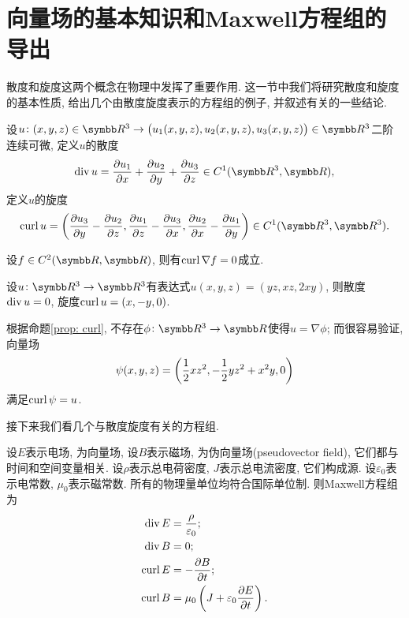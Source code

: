 \section{向量场的基本知识和Maxwell方程组的导出}

散度和旋度这两个概念在物理中发挥了重要作用. 这一节中我们将研究散度和旋度的基本性质, 给出几个由散度旋度表示的方程组的例子, 并叙述有关的一些结论.

\begin{definition}
    设$u\colon (x, y, z)\in\BR^3\to \left(u_1(x, y, z), u_2(x, y, z), u_3(x, y, z)\right)\in\BR^3$二阶连续可微, 定义$u$的散度
    \begin{equation}
        \divv u = \frac{\partial u_1}{\partial x}+\frac{\partial u_2}{\partial y}+ \frac{\partial u_3}{\partial z}\in C^1(\BR^3, \BR),
    \end{equation}
    定义$u$的旋度
    \begin{equation}
        \curl u = \lr(){\pdiff{u_3}{y} - \pdiff{u_2}{z}, \pdiff{u_1}{z} - \pdiff{u_3}{x}, \pdiff{u_2}{x} - \pdiff{u_1}{y}}\in C^1(\BR^3, \BR^3).
    \end{equation}
\end{definition}
\begin{proposition}\label{prop: curl}
    设$f\in C^2(\BR, \BR)$, 则有$\curl\nabla f = 0$成立.
\end{proposition}
\begin{example}
    设$u\colon \BR^3\to\BR^3$有表达式$u(x, y, z) = (yz, xz, 2xy)$,
    则散度$\divv u = 0$,
    旋度$\curl u = (x, -y, 0)$.

    根据命题\ref{prop: curl}, 不存在$\phi\colon \BR^3\to\BR$使得$u=\nabla \phi$; 而很容易验证, 向量场
    \begin{equation}
        \psi(x, y, z) = \lr(){\frac12 xz^2, -\frac12 yz^2+x^2y, 0}
    \end{equation}
    满足$\curl \psi = u$.
\end{example}

接下来我们看几个与散度旋度有关的方程组.

\begin{example}
    设$E$表示电场, 为向量场, 设$B$表示磁场, 为伪向量场(pseudovector field), 它们都与时间和空间变量相关. 设$\rho$表示总电荷密度, $J$表示总电流密度, 它们构成源. 设$\varepsilon_0$表示电常数, $\mu_0$表示磁常数. 所有的物理量单位均符合国际单位制. 则Maxwell方程组为
    \begin{align}
        \divv E &= \frac{\rho}{\varepsilon_0};\\
        \divv B &= 0;\\
        \curl E &= -\pdiff{B}{t};\\
        \curl B &= \mu_0\left(J+\varepsilon_0 \pdiff{E}{t}\right).
    \end{align}
\end{example}

